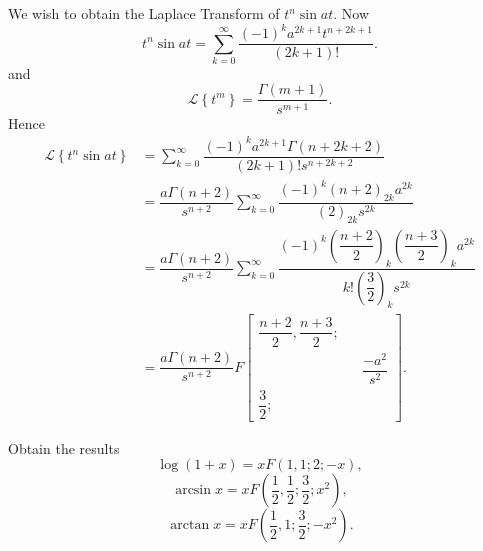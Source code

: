 \begin{solution}
We wish to obtain the Laplace Transform of $t^n \sin at$. Now
$$t^n \sin at = \displaystyle\sum_{k=0}^{\infty} \dfrac{(-1)^k a^{2k+1} t^{n+2k+1}}{(2k+1)!}.$$
and
$$\mathscr{L} \left\{ t^m \right\} = \dfrac{\Gamma(m+1)}{s^{m+1}}.$$
Hence
$$\begin{array}{ll}
\mathscr{L} \left\{ t^n \sin at \right\} &= \displaystyle\sum_{k=0}^{\infty} \dfrac{(-1)^k a^{2k+1} \Gamma(n+2k+2)}{(2k+1)! s^{n+2k+2}} \\
&= \dfrac{a \Gamma(n+2)}{s^{n+2}} \displaystyle\sum_{k=0}^{\infty} \dfrac{(-1)^k (n+2)_{2k} a^{2k}}{(2)_{2k} s^{2k}} \\
&= \dfrac{a \Gamma(n+2)}{s^{n+2}} \displaystyle\sum_{k=0}^{\infty} \dfrac{(-1)^k \left( \dfrac{n+2}{2} \right)_k \left( \dfrac{n+3}{2} \right)_k a^{2k}}{k! \left( \dfrac{3}{2} \right)_k s^{2k}} \\
&= \dfrac{a \Gamma(n+2)}{s^{n+2}} F \left[ \begin{array}{rlr}
\dfrac{n+2}{2}, \dfrac{n+3}{2}; & & \\
& & \dfrac{-a^2}{s^2} \\
\dfrac{3}{2}; & & 
\end{array} \right].
\end{array}$$
\end{solution}
\begin{problem}\label{problem18chapter4}
Obtain the results
$$\log(1+x) = xF(1,1;2;-x),$$
$$\arcsin x = xF \left(\dfrac{1}{2}, \dfrac{1}{2}; \dfrac{3}{2}; x^2 \right),$$
$$\arctan x = x F \left( \dfrac{1}{2}, 1; \dfrac{3}{2}; -x^2 \right).$$
\end{problem}
